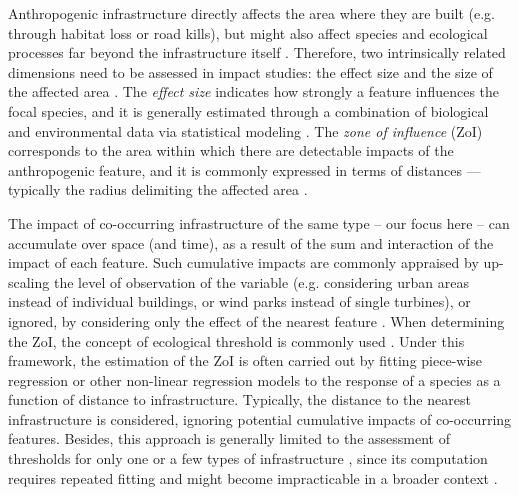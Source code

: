 \documentclass[titlepage]{article}
\begin{document}
Anthropogenic infrastructure directly affects the area where they are built (e.g. through habitat loss or road kills), but might also affect species and ecological processes far beyond the infrastructure itself \citep[e.g. by causing avoidance responses and reducing the probability of animal occurrence in its proximity;][]{johnson_cumulative_2005,torres_assessing_2016,dorber_indicators_2022}. Therefore, two intrinsically related dimensions need to be assessed in impact studies: the effect size and the size of the affected area \citep[Box 1; ][]{naugle_unifying_2011}. The \textit{effect size} indicates how strongly a feature influences the focal species, and it is generally estimated through a combination of biological and environmental data via statistical modeling \citep[Box 1;][]{polfus_identifying_2011}. The \textit{zone of influence} (ZoI) 
corresponds to the area within which there are detectable impacts of the anthropogenic feature, and it is commonly expressed in terms of distances --- typically the radius delimiting the affected area \citep[Box 1;][]{boulanger_estimating_2012}. 

The impact of co-occurring infrastructure of the same type -- our focus here -- can accumulate over space (and time), as a result of the sum and interaction of the impact of each feature. Such cumulative impacts are commonly appraised by up-scaling the level of observation of the variable (e.g. considering urban areas instead of individual buildings, or wind parks instead of single turbines), or ignored, by considering only the effect of the nearest feature \citep[e.g. nearest house or turbine;][]{torres_assessing_2016}.
When determining the ZoI, the concept of ecological threshold
is commonly used \citep[see][and analytical procedures therein]{ficetola_ecological_2009}. Under this framework, the estimation of the ZoI is often carried out by fitting piece-wise regression or other non-linear regression models \citep[e.g. exponential decay or generalized additive models;][]{skarin_out_2018, ficetola_ecological_2009} to the response of a species as a function of distance to infrastructure. Typically, the distance to the nearest infrastructure is considered, ignoring potential cumulative impacts of co-occurring features. Besides, this approach is generally limited to the assessment of thresholds for only one or a few types of infrastructure \citep[e.g.][]{boulanger_estimating_2012}, since its computation requires repeated fitting and might become impracticable in a broader context \citep{lee_estimating_2020}. 
\end{document}
